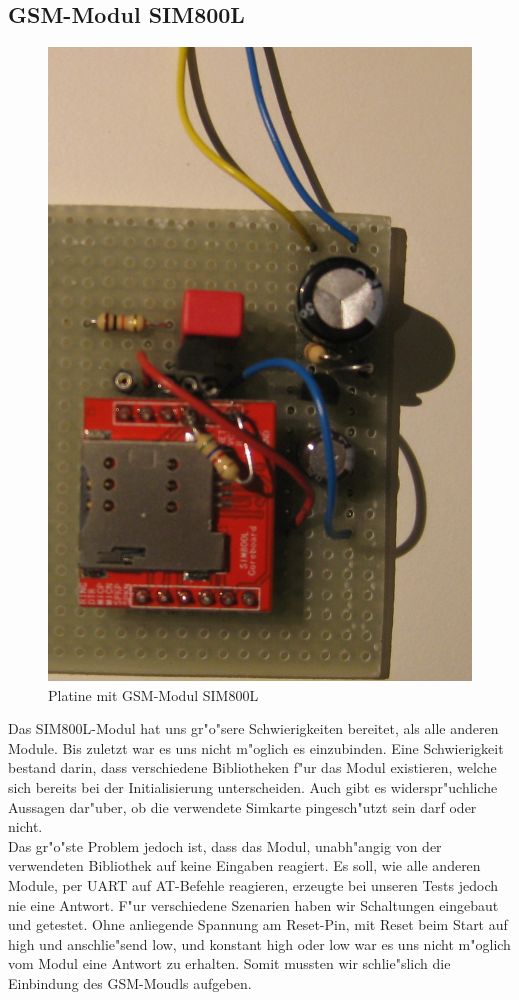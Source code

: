 \documentclass[a4paper,11pt, ngerman]{scrartcl}
\makeatletter
\def\clearwf{\par{\count@\c@WF@wrappedlines\zz}\par}
\def\zz{{%
\ifnum\count@>\@ne
\noindent\mbox{~~}\\%
\advance\count@\m@ne
\expandafter\zz
\else
\ifhmode\unskip\unpenalty\fi
\fi}}
\makeatother
\begin{document}
\subsection{GSM-Modul SIM800L}
\begin{figure}
	\includegraphics[width=.95\linewidth]{GSM.JPG}
	\caption{Platine mit GSM-Modul SIM800L}\vspace{-20pt}
\end{figure}
Das SIM800L-Modul hat uns gr"o"sere Schwierigkeiten bereitet, als alle anderen Module. Bis zuletzt war es uns nicht m"oglich es einzubinden. Eine Schwierigkeit bestand darin, dass verschiedene Bibliotheken f"ur das Modul existieren, welche sich bereits bei der Initialisierung unterscheiden. Auch gibt es widerspr"uchliche Aussagen dar"uber, ob die verwendete Simkarte pingesch"utzt sein darf oder nicht.\\
Das gr"o"ste Problem jedoch ist, dass das Modul, unabh"angig von der verwendeten Bibliothek auf keine Eingaben reagiert. Es soll, wie alle anderen Module, per UART auf AT-Befehle reagieren, erzeugte bei unseren Tests jedoch nie eine Antwort. 
F"ur verschiedene Szenarien haben wir Schaltungen eingebaut und getestet. Ohne anliegende Spannung am Reset-Pin, mit Reset beim Start auf high und anschlie"send low, und konstant high oder low war es uns nicht m"oglich vom Modul eine Antwort zu erhalten. Somit mussten wir schlie"slich die Einbindung des GSM-Moudls aufgeben.\clearwf
\end{document}
